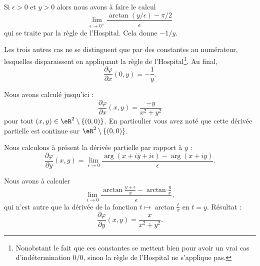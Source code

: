\begin{normaltext}
\begin{subproof}
		Si \( \epsilon>0\) et \( y>0\) alors nous avons à faire le calcul
		\begin{equation}
			\lim_{\epsilon\to 0^+}\frac{ \arctan(y/\epsilon)-\pi/2 }{ \epsilon }
		\end{equation}
		qui se traite par la règle de l'Hospital. Cela donne \( -1/y\).

		Les trois autres cas ne se distinguent que par des constantes au numérateur, lesquelles disparaissent en appliquant la règle de l'Hospital\footnote{Nonobstant le fait que ces constantes se mettent bien pour avoir un vrai cas d'indétermination \( 0/0\), sinon la règle de l'Hospital ne s'applique pas.}. Au final,
		\begin{equation}
			\frac{ \partial \varphi }{ \partial x }(0,y)=-\frac{1}{ y }.
		\end{equation}
	\end{subproof}

	Nous avons calculé jusqu'ici :
	\begin{equation}        \label{EQooAOJPooOrvUBR}
		\frac{ \partial \varphi }{ \partial x }(x,y)=\frac{ -y }{ x^2+y^2 }
	\end{equation}
	pour tout \( (x,y)\in \eR^2\setminus\{ (0,0) \}\). En particulier vous avez noté que cette dérivée partielle est continue sur \( \eR^2\setminus\{ (0,0) \}\).

	Nous calculons à présent la dérivée partielle par rapport à \( y\) :
	\begin{equation}
		\frac{ \partial \varphi }{ \partial y }(x,y)=\lim_{\epsilon\to 0}\frac{ \arg(x+iy+i\epsilon)-\arg(x+iy) }{ \epsilon }.
	\end{equation}

	\begin{subproof}

		\spitem[\( x>0\)]

		Nous avons à calculer
		\begin{equation}
			\lim_{\epsilon\to 0}\frac{ \arctan\frac{ y+\epsilon }{ x }-\arctan\frac{ y }{ x } }{ \epsilon },
		\end{equation}
		qui n'est autre que la dérivée de la fonction \( t\mapsto\arctan\frac{ t }{ x }\) en \( t=y\). Résultat :
		\begin{equation}
			\frac{ \partial \varphi }{ \partial y }(x,y)=\frac{ x }{ x^2+y^2 }.
		\end{equation}

		\spitem[\( x<0  \) et \( y\neq 0\)]


\end{subproof}
\end{normaltext}
